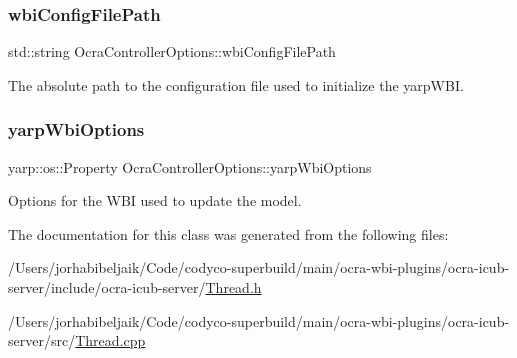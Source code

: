 \subsubsection{\texorpdfstring{wbi\+Config\+File\+Path}{wbiConfigFilePath}}
{\footnotesize\ttfamily std\+::string Ocra\+Controller\+Options\+::wbi\+Config\+File\+Path}

The absolute path to the configuration file used to initialize the yarp\+W\+BI. \hypertarget{classOcraControllerOptions_ac3965bdcce6cb2ce3e4a335f855acd63}{}\label{classOcraControllerOptions_ac3965bdcce6cb2ce3e4a335f855acd63} 
\subsubsection{\texorpdfstring{yarp\+Wbi\+Options}{yarpWbiOptions}}
{\footnotesize\ttfamily yarp\+::os\+::\+Property Ocra\+Controller\+Options\+::yarp\+Wbi\+Options}

Options for the W\+BI used to update the model. 

The documentation for this class was generated from the following files\+:\begin{DoxyCompactItemize}
\item 
/\+Users/jorhabibeljaik/\+Code/codyco-\/superbuild/main/ocra-\/wbi-\/plugins/ocra-\/icub-\/server/include/ocra-\/icub-\/server/\hyperlink{Thread_8h}{Thread.\+h}\item 
/\+Users/jorhabibeljaik/\+Code/codyco-\/superbuild/main/ocra-\/wbi-\/plugins/ocra-\/icub-\/server/src/\hyperlink{Thread_8cpp}{Thread.\+cpp}\end{DoxyCompactItemize}
